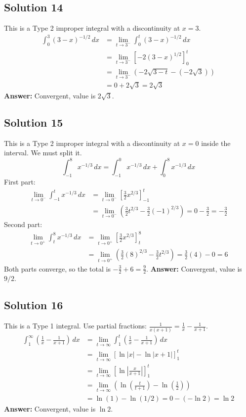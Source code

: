 \documentclass{article}
\begin{document}
\subsection*{Solution 14}
This is a Type 2 improper integral with a discontinuity at $x=3$.
\begin{align*}
\int_{0}^{3} (3-x)^{-1/2} \,dx &= \lim_{t \to 3^-} \int_{0}^{t} (3-x)^{-1/2} \,dx \\
&= \lim_{t \to 3^-} \left[ -2(3-x)^{1/2} \right]_{0}^{t} \\
&= \lim_{t \to 3^-} \left( -2\sqrt{3-t} - (-2\sqrt{3}) \right) \\
&= 0 + 2\sqrt{3} = 2\sqrt{3}
\end{align*}
\textbf{Answer:} Convergent, value is $2\sqrt{3}$.

\subsection*{Solution 15}
This is a Type 2 improper integral with a discontinuity at $x=0$ inside the interval. We must split it.
\[ \int_{-1}^{8} x^{-1/3} \,dx = \int_{-1}^{0} x^{-1/3} \,dx + \int_{0}^{8} x^{-1/3} \,dx \]
First part:
\begin{align*}
\lim_{t \to 0^-} \int_{-1}^{t} x^{-1/3} \,dx &= \lim_{t \to 0^-} \left[ \frac{3}{2}x^{2/3} \right]_{-1}^{t} \\
&= \lim_{t \to 0^-} \left( \frac{3}{2}t^{2/3} - \frac{3}{2}(-1)^{2/3} \right) = 0 - \frac{3}{2} = -\frac{3}{2}
\end{align*}
Second part:
\begin{align*}
\lim_{t \to 0^+} \int_{t}^{8} x^{-1/3} \,dx &= \lim_{t \to 0^+} \left[ \frac{3}{2}x^{2/3} \right]_{t}^{8} \\
&= \lim_{t \to 0^+} \left( \frac{3}{2}(8)^{2/3} - \frac{3}{2}t^{2/3} \right) = \frac{3}{2}(4) - 0 = 6
\end{align*}
Both parts converge, so the total is $-\frac{3}{2} + 6 = \frac{9}{2}$.
\textbf{Answer:} Convergent, value is $9/2$.

\subsection*{Solution 16}
This is a Type 1 integral. Use partial fractions: $\frac{1}{x(x+1)} = \frac{1}{x} - \frac{1}{x+1}$.
\begin{align*}
\int_{1}^{\infty} \left(\frac{1}{x} - \frac{1}{x+1}\right) \,dx &= \lim_{t \to \infty} \int_{1}^{t} \left(\frac{1}{x} - \frac{1}{x+1}\right) \,dx \\
&= \lim_{t \to \infty} \left[ \ln|x| - \ln|x+1| \right]_{1}^{t} \\
&= \lim_{t \to \infty} \left[ \ln\left|\frac{x}{x+1}\right| \right]_{1}^{t} \\
&= \lim_{t \to \infty} \left( \ln\left(\frac{t}{t+1}\right) - \ln\left(\frac{1}{2}\right) \right) \\
&= \ln(1) - \ln(1/2) = 0 - (-\ln 2) = \ln 2
\end{align*}
\textbf{Answer:} Convergent, value is $\ln 2$.
\end{document}
